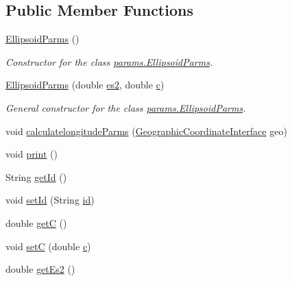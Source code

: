 \subsection*{Public Member Functions}
\begin{DoxyCompactItemize}
\item 
\hyperlink{classparams_1_1_ellipsoid_parms_ae8dcc24aa03ce1f0c6ccd2daf1c549fc}{Ellipsoid\+Parms} ()
\begin{DoxyCompactList}\small\item\em Constructor for the class \hyperlink{classparams_1_1_ellipsoid_parms}{params.\+Ellipsoid\+Parms}. \end{DoxyCompactList}\item 
\hyperlink{classparams_1_1_ellipsoid_parms_a76412304312a0a253086d195874110c0}{Ellipsoid\+Parms} (double \hyperlink{classparams_1_1_ellipsoid_parms_acf2fe964606a777fb4a40537b97847b1}{es2}, double \hyperlink{classparams_1_1_ellipsoid_parms_a8c4aea13fd32cd84761c5fa923a3b56a}{c})
\begin{DoxyCompactList}\small\item\em General constructor for the class \hyperlink{classparams_1_1_ellipsoid_parms}{params.\+Ellipsoid\+Parms}. \end{DoxyCompactList}\item 
void \hyperlink{classparams_1_1_ellipsoid_parms_ad33cde2be306e100c10b186416864d36}{calculatelongitude\+Parms} (\hyperlink{classcoordinates_1_1_geographic_coordinate_interface}{Geographic\+Coordinate\+Interface} geo)
\item 
void \hyperlink{classparams_1_1_ellipsoid_parms_a8b38d69a8ce2fe13c763c4dec003caa3}{print} ()
\item 
String \hyperlink{classparams_1_1_ellipsoid_parms_aba1d562097bdfbdca02d1297bb7eef40}{get\+Id} ()
\item 
void \hyperlink{classparams_1_1_ellipsoid_parms_a39defb526e42409be9d233cc5f51d17c}{set\+Id} (String \hyperlink{classparams_1_1_ellipsoid_parms_a0dc788084fb0dd603ace16e936382883}{id})
\item 
double \hyperlink{classparams_1_1_ellipsoid_parms_ac6d2d8e560b2c5f93f1eae7e47da312e}{getC} ()
\item 
void \hyperlink{classparams_1_1_ellipsoid_parms_a290c9540675e92d4fe57b6d8c99a6864}{setC} (double \hyperlink{classparams_1_1_ellipsoid_parms_a8c4aea13fd32cd84761c5fa923a3b56a}{c})
\item 
double \hyperlink{classparams_1_1_ellipsoid_parms_af125c68eb54a52388877a1ddbd38f827}{get\+Es2} ()
\item 

\end{DoxyCompactItemize}
